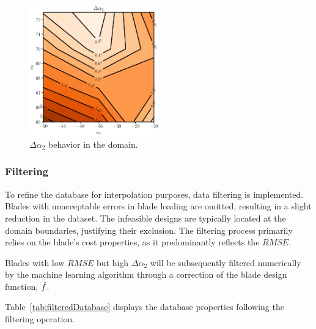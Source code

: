 \documentclass[11pt,a4paper,twocolumn]{article}
\begin{document}
\begin{figure}[!h]
    \centering
    \includegraphics[width=0.5\textwidth]{./images/angleError.eps}
    \caption{$\Delta \alpha_2$ behavior in the domain.}
    \label{fig:angleError}
\end{figure}

\subsubsection{Filtering}

To refine the database for interpolation purposes, data filtering is implemented. Blades with unacceptable errors in blade loading are omitted, resulting in a slight reduction in the dataset. The infeasible designs are typically located at the domain boundaries, justifying their exclusion. The filtering process primarily relies on the blade's cost properties, as it predominantly reflects the $RMSE$.

Blades with low $RMSE$ but high $\Delta \alpha_2$ will be subsequently filtered numerically by the machine learning algorithm through a correction of the blade design function, $\hat{\mathnormal{f}}$.

Table~\ref{tab:filteredDatabase} displays the database properties following the filtering operation.
\end{document}
